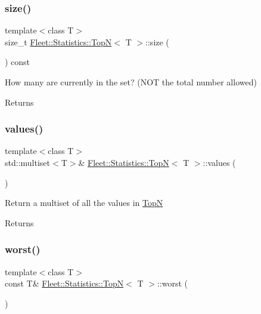 \subsubsection{\texorpdfstring{size()}{size()}}
{\footnotesize\ttfamily template$<$class T$>$ \\
size\+\_\+t \hyperlink{class_fleet_1_1_statistics_1_1_top_n}{Fleet\+::\+Statistics\+::\+TopN}$<$ T $>$\+::size (\begin{DoxyParamCaption}{ }\end{DoxyParamCaption}) const\hspace{0.3cm}{\ttfamily [inline]}}

How many are currently in the set? (N\+OT the total number allowed) \begin{DoxyReturn}{Returns}

\end{DoxyReturn}
\mbox{\label{class_fleet_1_1_statistics_1_1_top_n_ab271ffaa959392966d1d00407485bfc9}} 
\subsubsection{\texorpdfstring{values()}{values()}}
{\footnotesize\ttfamily template$<$class T$>$ \\
std\+::multiset$<$T$>$\& \hyperlink{class_fleet_1_1_statistics_1_1_top_n}{Fleet\+::\+Statistics\+::\+TopN}$<$ T $>$\+::values (\begin{DoxyParamCaption}{ }\end{DoxyParamCaption})\hspace{0.3cm}{\ttfamily [inline]}}

Return a multiset of all the values in \hyperlink{class_fleet_1_1_statistics_1_1_top_n}{TopN} \begin{DoxyReturn}{Returns}

\end{DoxyReturn}
\mbox{\label{class_fleet_1_1_statistics_1_1_top_n_a7be596fb7defba492b503371c58b30ce}} 
\subsubsection{\texorpdfstring{worst()}{worst()}}
{\footnotesize\ttfamily template$<$class T$>$ \\
const T\& \hyperlink{class_fleet_1_1_statistics_1_1_top_n}{Fleet\+::\+Statistics\+::\+TopN}$<$ T $>$\+::worst (\begin{DoxyParamCaption}{ }\end{DoxyParamCaption})\hspace{0.3cm}{\ttfamily [inline]}}

